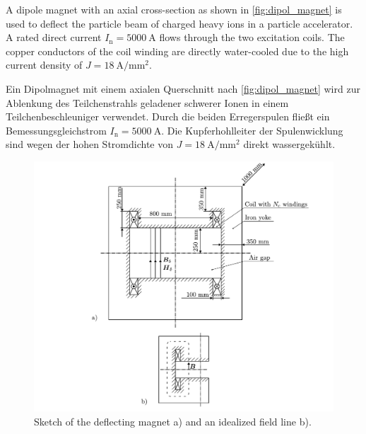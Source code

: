 

A dipole magnet with an axial cross-section as shown in \autoref{fig:dipol_magnet} is used to deflect the particle beam of charged heavy ions in a particle accelerator. A rated direct current $I_{\mathrm{n}} = \SI{5000}{\ampere}$ flows through the two excitation coils. The copper conductors of the coil winding are directly water-cooled due to the high current density of $J = \SI{18}{\ampere\per\milli\metre^2}$.

\begin{germanblock}
    Ein Dipolmagnet mit einem axialen Querschnitt nach \autoref{fig:dipol_magnet} wird zur Ablenkung des Teilchenstrahls geladener schwerer Ionen in einem Teilchenbeschleuniger verwendet. Durch die beiden Erregerspulen fließt ein Bemessungsgleichstrom $I_{\mathrm{n}} = \SI{5000}{\ampere}$. Die Kupferhohlleiter der Spulenwicklung sind wegen der hohen Stromdichte von $J = \SI{18}{\ampere\per\milli\metre^2}$ direkt wassergekühlt.
\end{germanblock}

\begin{figure}[h!]
    \centering
    \includegraphics{fig/sketch_dipol_magnet.pdf}
    \caption{Sketch of the deflecting magnet a) and an idealized field line b).}
    \label{fig:dipol_magnet}
\end{figure}



